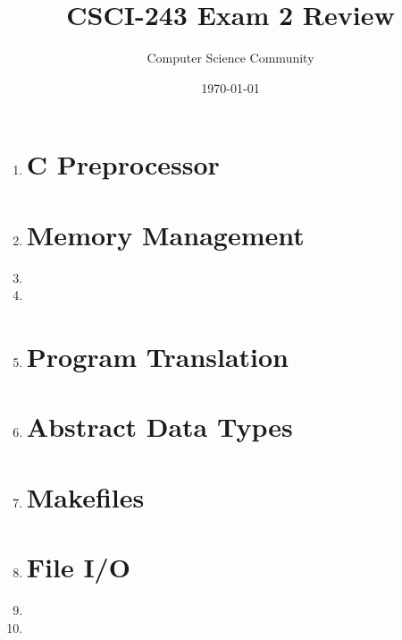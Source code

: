 \documentclass[11pt]{article}
\title{CSCI-243 Exam 2 Review}
\author{Computer Science Community}
\date{\today}
\begin{document}
	\header 

	\begin{enumerate}
		\section*{C}
		\item 

		\section*{C Preprocessor}
		\item 

		\section*{Memory Management}
		\item 

		\item 

		\item 
		
		\section*{Program Translation}
		\item 
		
		\section*{Abstract Data Types}
		\item 

		\section*{Makefiles}
		\item 

		\section*{File I/O}
		\item 
		
		\item 
	\end{enumerate}
\end{document}
